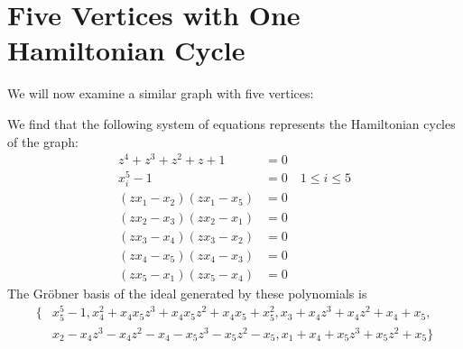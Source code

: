 \documentclass[letterpaper]{article}
\newcommand{\aln}[1]{\begin{align*} #1 \end{align*}} %
\begin{document}
\section{Five Vertices with One Hamiltonian Cycle}
We will now examine a similar graph with five vertices:
\begin{center}
\end{center}
We find that the following system of equations represents the Hamiltonian cycles of the graph:
\aln{
  z^4 + z^3 + z^2 + z + 1 &= 0\\
  x_i^5 - 1 &= 0 \quad 1 \leq i \leq 5\\
  (z x_1 - x_2) (z x_1 - x_5) &= 0\\
  (z x_2 - x_3) (z x_2 - x_1) &= 0\\
  (z x_3 - x_4) (z x_3 - x_2) &= 0\\
  (z x_4 - x_5) (z x_4 - x_3) &= 0\\
  (z x_5 - x_1) (z x_5 - x_4) &= 0
}
The Gr\"obner basis of the ideal generated by these polynomials is
\aln{
  \{&x_5^5-1, x_4^2+x_4x_5z^3+x_4x_5z^2+x_4x_5+x_5^2, x_3+x_4z^3+x_4z^2+x_4+x_5,\\& x_2-x_4z^3-x_4z^2-x_4-x_5z^3-x_5z^2-x_5, x_1+x_4+x_5z^3+x_5z^2+x_5\}
}
\end{document}
